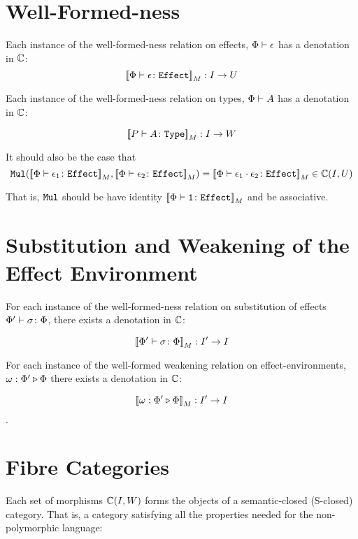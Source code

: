 \documentclass{report}
\begin{document}
\section{Well-Formed-ness}

Each instance of the well-formed-ness relation on effects, $\Phi\vdash \epsilon$ has a denotation in $\mathbb{C}$: \begin{equation}
    {\bf [\![}\Phi \vdash \epsilon \colon \texttt{Effect}{\bf ]\!]}_M: I \rightarrow U
\end{equation}


Each instance of the well-formed-ness relation on types, $\Phi\vdash A$ has a denotation in $\mathbb{C}$:

\begin{equation}
    {\bf [\![}P \vdash A \colon \texttt{Type}{\bf ]\!]}_M: I \rightarrow W
\end{equation}

It should also be the case that \begin{equation}
    \texttt{Mul}({\bf [\![}\Phi \vdash \epsilon_1 \colon \texttt{Effect}{\bf ]\!]}_M, {\bf [\![}\Phi \vdash \epsilon_2 \colon \texttt{Effect}{\bf ]\!]}_M) = {\bf [\![}\Phi \vdash \epsilon_1\cdot\epsilon_2 \colon \texttt{Effect}{\bf ]\!]}_M \in \mathbb{C}(I, U)
\end{equation}

That is, $\texttt{Mul}$ should be have identity ${\bf [\![}\Phi \vdash \texttt{1} \colon \texttt{Effect}{\bf ]\!]}_M$ and be associative.
\section{Substitution and Weakening of the Effect Environment}

For each instance of the well-formed-ness relation on substitution of effects $\Phi' \vdash \sigma \colon \Phi$, there exists a denotation in $\mathbb{C}$:

\begin{equation}
    {\bf [\![}\Phi' \vdash \sigma \colon \Phi{\bf ]\!]}_M: I'\rightarrow I
\end{equation}

For each instance of the well-formed weakening relation on effect-environments, $\omega : \Phi' \triangleright \Phi$
 there exists a denotation in $\mathbb{C}$:

 \begin{equation}
     {\bf [\![}\omega : \Phi' \triangleright \Phi{\bf ]\!]}_M: I'\rightarrow I
 \end{equation}.

\section{Fibre Categories}
Each set of morphisms $\mathbb{C}(I, W)$ forms the objects of a semantic-closed (S-closed) category. That is, a category satisfying all the properties needed for the non-polymorphic language:
\end{document}
